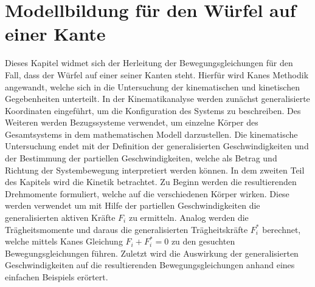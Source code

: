 \ifx\FORMAT\undefined


\fi

\chapter{Modellbildung für den Würfel auf  einer Kante}\label{chapter_TM_Edge}
Dieses Kapitel widmet sich der Herleitung der Bewegungsgleichungen für den Fall, dass der Würfel auf einer seiner Kanten steht. Hierfür wird Kanes Methodik \cite{KaneBook} angewandt, welche sich in die Untersuchung der kinematischen und kinetischen Gegebenheiten unterteilt. In der Kinematikanalyse werden zunächst generalisierte Koordinaten eingeführt, um die Konfiguration des Systems zu beschreiben. Des Weiteren werden Bezugssysteme verwendet, um einzelne Körper des Gesamtsystems in dem mathematischen Modell darzustellen. Die kinematische Untersuchung endet mit der Definition der generalisierten Geschwindigkeiten und der Bestimmung der partiellen Geschwindigkeiten, welche als Betrag und Richtung der Systembewegung interpretiert werden können.
In dem zweiten Teil des Kapitels wird die Kinetik betrachtet. Zu Beginn werden die resultierenden Drehmomente formuliert, welche auf die verschiedenen Körper wirken. Diese werden verwendet um mit Hilfe der partiellen Geschwindigkeiten die generalisierten aktiven Kräfte $F_i$ zu ermitteln. Analog werden die Trägheitsmomente und daraus die generalisierten Trägheitskräfte $F^*_i$ berechnet, welche mittels Kanes Gleichung $F_i+F^*_i=0$ zu den gesuchten Bewegungsgleichungen führen. Zuletzt wird die Auswirkung der generalisierten Geschwindigkeiten auf die resultierenden Bewegungsgleichungen anhand eines einfachen Beispiels erörtert.
\newpage

\newpage


\ifx\FORMAT\undefined

\fi